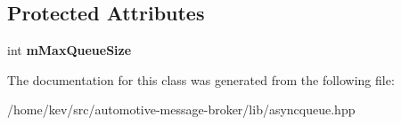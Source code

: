 \subsection*{Protected Attributes}
\begin{DoxyCompactItemize}
\item 
\hypertarget{classamb_1_1AsyncQueueWatcher_a2dd2243a734ce4cd960f689e5cd9988c}{int {\bfseries m\+Max\+Queue\+Size}}\label{classamb_1_1AsyncQueueWatcher_a2dd2243a734ce4cd960f689e5cd9988c}

\end{DoxyCompactItemize}


The documentation for this class was generated from the following file\+:\begin{DoxyCompactItemize}
\item 
/home/kev/src/automotive-\/message-\/broker/lib/asyncqueue.\+hpp\end{DoxyCompactItemize}
